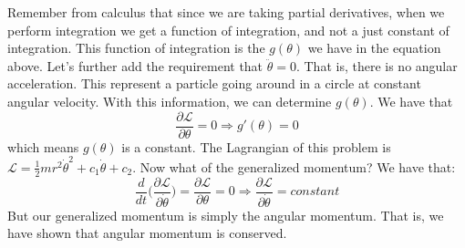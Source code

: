 \documentclass[crop=false,class=book,oneside]{standalone}
\begin{document}
        Remember from calculus that since we are taking partial
        derivatives, when we perform integration we get a function
        of integration, and not a just constant of integration.
        This function of integration is the $g(\theta)$
        we have in the equation above. Let's further add the
        requirement that $\ddot{\theta}=0$. That is,
        there is no angular acceleration.
        This represent a particle going around in a circle at
        constant angular velocity. With this information,
        we can determine $g(\theta)$. We have that
        \begin{equation*}
            \frac{\partial\mathcal{L}}{\partial\theta}
            =0
            \Rightarrow
            g'(\theta)=0
        \end{equation*}
        which means $g(\theta)$ is a constant. The Lagrangian of
        this problem is
        $\mathcal{L}%
         =\frac{1}{2}mr^{2}\dot{\theta}^{2}%
         +c_{1}\dot{\theta}+c_{2}$.
        Now what of the generalized momentum? We have that:
        \begin{equation*}
            \frac{d}{dt}\big(
                \frac{\partial\mathcal{L}}{\partial\dot{\theta}}
             \big)
            =\frac{\partial\mathcal{L}}{\partial\theta}=0
            \Rightarrow
            \frac{\partial\mathcal{L}}{\partial\dot{\theta}}
            =constant
        \end{equation*}
        But our generalized momentum is simply the
        angular momentum. That is, we have shown
        that angular momentum is conserved.
\end{document}
